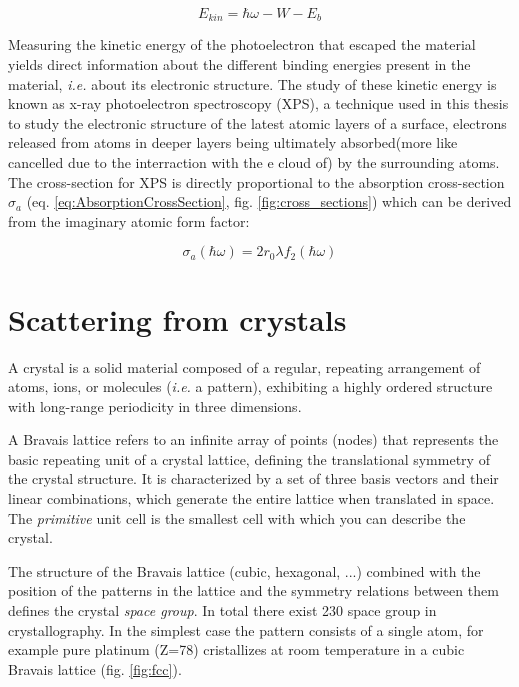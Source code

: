 \begin{equation}
    E_{kin} = \hbar\omega - W - E_b
\end{equation}

Measuring the kinetic energy of the photoelectron that escaped the material yields direct information about the different binding energies present in the material, \textit{i.e.} about its electronic structure.
The study of these kinetic energy is known as x-ray photoelectron spectroscopy (XPS),
a technique used in this thesis to study the electronic structure of the latest atomic layers of a surface, electrons released from atoms in deeper layers being ultimately absorbed(more like cancelled due to the interraction with the e cloud of) by the surrounding atoms.
The cross-section for XPS is directly proportional to the absorption cross-section $\sigma_a$ (eq. \ref{eq:AbsorptionCrossSection}, fig. \ref{fig:cross_sections}) which can be derived from the imaginary atomic form factor:

\begin{equation}
    \label{eq:AbsorptionCrossSection}
    \sigma_a(\hbar\omega) = 2 r_0 \lambda f_2(\hbar\omega)
\end{equation}

\section{Scattering from crystals}

A crystal is a solid material composed of a regular, repeating arrangement of atoms, ions, or molecules (\textit{i.e.} a pattern), exhibiting a highly ordered structure with long-range periodicity in three dimensions.

A Bravais lattice refers to an infinite array of points (nodes) that represents the basic repeating unit of a crystal lattice, defining the translational symmetry of the crystal structure.
It is characterized by a set of three basis vectors and their linear combinations, which generate the entire lattice when translated in space.
The \textit{primitive} unit cell is the smallest cell with which you can describe the crystal.

The structure of the Bravais lattice (cubic, hexagonal, ...) combined with the position of the patterns in the lattice and the symmetry relations between them defines the crystal \textit{space group}.
In total there exist 230 space group in crystallography.
In the simplest case the pattern consists of a single atom, for example pure platinum (Z=78) cristallizes at room temperature in a cubic Bravais lattice (fig. \ref{fig:fcc}).

